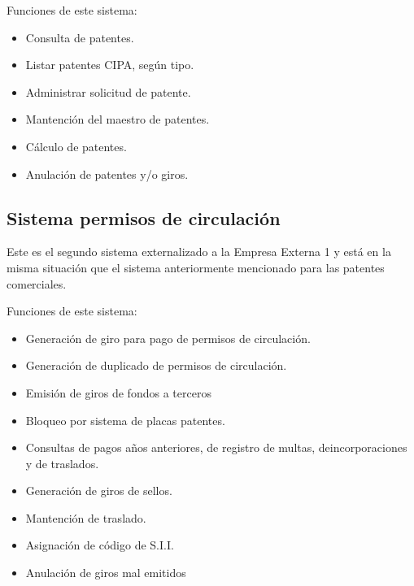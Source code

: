 Funciones de este sistema:
\begin{itemize}
\item Consulta  de patentes.
\item Listar patentes  CIPA, según tipo.
\item Administrar  solicitud  de patente.
\item Mantención  del maestro  de patentes.
\item Cálculo  de patentes.
\item Anulación  de patentes  y/o giros.
\end{itemize}


\subsection{Sistema permisos de circulación}
Este es el segundo sistema externalizado a la Empresa Externa 1 y está en la misma situación que el sistema anteriormente mencionado para las patentes comerciales.

Funciones de este sistema:
\begin{itemize}
\item Generación  de giro para pago de permisos  de circulación.
\item Generación  de duplicado  de permisos  de circulación.
\item Emisión  de giros de fondos  a terceros
\item Bloqueo  por sistema  de placas  patentes.
\item Consultas   de  pagos  años  anteriores,   de  registro  de  multas,   deincorporaciones  y de traslados.
\item Generación  de giros de sellos.
\item Mantención  de traslado.
\item Asignación  de código de S.I.I.
\item Anulación  de giros mal emitidos
\end{itemize}